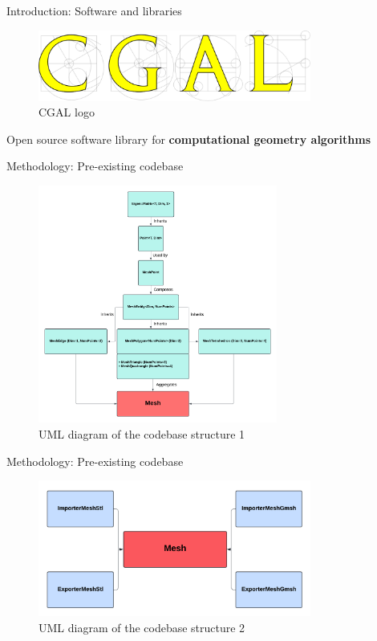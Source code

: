 \documentclass[10pt]{beamer}
\begin{document}
\begin{frame}{Introduction: Software and libraries}
  \Large
  \begin{figure}[H]
      \centering
      \includegraphics[width=0.8\textwidth]{images/logo-cgal.png}
      \caption{CGAL logo\cite{cgal}}
  \end{figure}
  \begin{center}
    \Large Open source software library for \textbf{computational geometry algorithms}
  \end{center}
\end{frame}

\begin{frame}{Methodology: Pre-existing codebase}
  \begin{figure}[H]
    \centering
    \includegraphics[width=0.7\textwidth]{images/uml-codebase-1.png}
    \caption{UML diagram of the codebase structure 1}
  \end{figure}
\end{frame}

\begin{frame}{Methodology: Pre-existing codebase}
  \begin{figure}[H]
    \centering
    \includegraphics[width=0.8\textwidth]{images/uml-codebase-2.png}
    \caption{UML diagram of the codebase structure 2}
  \end{figure}
\end{frame}
\end{document}
